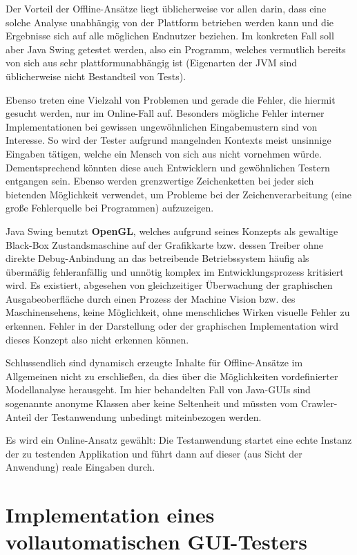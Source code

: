 Der Vorteil der Offline-Ansätze liegt üblicherweise vor allen darin, dass eine solche Analyse unabhängig von der
Plattform betrieben werden kann und die Ergebnisse sich auf alle möglichen Endnutzer beziehen.
Im konkreten Fall soll aber Java Swing getestet werden, also ein Programm, welches vermutlich
bereits von sich aus sehr plattformunabhängig ist (Eigenarten der JVM sind üblicherweise nicht
Bestandteil von Tests).

Ebenso treten eine Vielzahl von Problemen und gerade die Fehler, die hiermit gesucht werden,
nur im Online-Fall auf. Besonders mögliche Fehler interner Implementationen bei gewissen ungewöhnlichen
Eingabemustern sind von Interesse. So wird der Tester aufgrund mangelnden Kontexts meist unsinnige
Eingaben tätigen, welche ein Mensch von sich aus nicht vornehmen würde. Dementsprechend könnten
diese auch Entwicklern und gewöhnlichen Testern entgangen sein. Ebenso werden grenzwertige
Zeichenketten bei jeder sich bietenden Möglichkeit verwendet, um Probleme bei der Zeichenverarbeitung
(eine große Fehlerquelle bei Programmen) aufzuzeigen.

Java Swing benutzt \textbf{OpenGL}\label{openglQQ}, welches aufgrund seines Konzepts als gewaltige
Black-Box Zustandsmaschine auf der Grafikkarte bzw. dessen Treiber
ohne direkte Debug-Anbindung an das betreibende Betriebssystem
häufig als übermäßig fehleranfällig und unnötig komplex im Entwicklungsprozess kritisiert wird.
Es existiert, abgesehen von gleichzeitiger Überwachung der graphischen Ausgabeoberfläche
durch einen Prozess der \glqq{}Machine Vision\grqq{} bzw. des Maschinensehens, keine Möglichkeit,
ohne menschliches Wirken visuelle Fehler zu erkennen. Fehler in der Darstellung oder
der graphischen Implementation wird dieses Konzept also nicht erkennen können.

Schlussendlich sind dynamisch erzeugte Inhalte für Offline-Ansätze im Allgemeinen
nicht zu erschließen, da dies über die Möglichkeiten vordefinierter Modellanalyse herausgeht.
Im hier behandelten Fall von Java-GUIs sind sogenannte anonyme Klassen aber keine
Seltenheit und müssten vom Crawler-Anteil der Testanwendung unbedingt miteinbezogen werden.

Es wird ein Online-Ansatz gewählt: Die Testanwendung startet eine echte Instanz
der zu testenden Applikation und führt dann auf dieser (aus Sicht der Anwendung) reale
Eingaben durch.


\section{Implementation eines vollautomatischen GUI-Testers}\label{section:myfullautoguitest}



